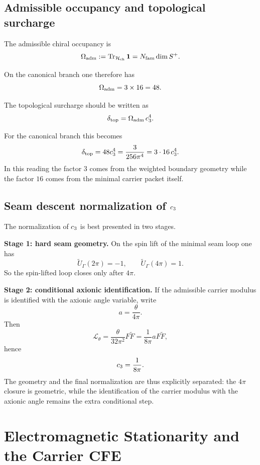 \subsection{Admissible occupancy and topological surcharge}

\begin{definition}
The admissible chiral occupancy is
\[
\Omega_{\mathrm{adm}} := \operatorname{Tr}_{\mathcal H_{\mathrm{ch}}}\mathbf 1 = N_{\mathrm{fam}}\dim S^+.
\]
\end{definition}

On the canonical branch one therefore has
\[
\Omega_{\mathrm{adm}} = 3\times 16 = 48.
\]

\begin{conjecture}
The topological surcharge should be written as
\[
\delta_{\mathrm{top}} = \Omega_{\mathrm{adm}}\,c_3^4.
\]
\end{conjecture}

For the canonical branch this becomes
\[
\delta_{\mathrm{top}} = 48c_3^4 = \frac{3}{256\pi^4} = 3\cdot 16\,c_3^4.
\]
In this reading the factor $3$ comes from the weighted boundary geometry while the factor $16$ comes from the minimal carrier packet itself.

\subsection{Seam descent normalization of \texorpdfstring{$c_3$}{c3}}

The normalization of $c_3$ is best presented in two stages.

\textbf{Stage 1: hard seam geometry.}
On the spin lift of the minimal seam loop one has
\[
\widetilde U_\Gamma(2\pi)=-1,
\qquad
\widetilde U_\Gamma(4\pi)=1.
\]
So the spin-lifted loop closes only after $4\pi$.

\textbf{Stage 2: conditional axionic identification.}
If the admissible carrier modulus is identified with the axionic angle variable, write
\[
a=\frac{\theta}{4\pi}.
\]
Then
\[
\mathcal L_\theta = \frac{\theta}{32\pi^2}F\widetilde F
= \frac{1}{8\pi}aF\widetilde F,
\]
hence
\[
c_3 = \frac{1}{8\pi}.
\]
The geometry and the final normalization are thus explicitly separated: the $4\pi$ closure is geometric, while the identification of the carrier modulus with the axionic angle remains the extra conditional step.

\section{Electromagnetic Stationarity and the Carrier CFE}


